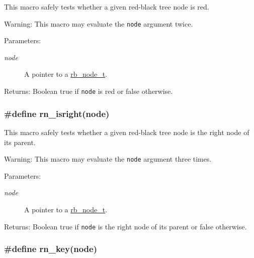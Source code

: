 This macro safely tests whether a given red-black tree node is red.

\begin{Desc}
\item[Warning:]This macro may evaluate the {\tt node} argument twice.\end{Desc}
\begin{Desc}
\item[Parameters:]
\begin{description}
\item[{\em node}]A pointer to a \hyperlink{group__dbprim__rbtree_a1}{rb\_\-node\_\-t}.\end{description}
\end{Desc}
\begin{Desc}
\item[Returns:]Boolean true if {\tt node} is red or false otherwise. \end{Desc}
\hypertarget{group__dbprim__rbtree_a37}{
\subsubsection[rn\_\-isright]{\setlength{\rightskip}{0pt plus 5cm}\#define rn\_\-isright(node)}}
\label{group__dbprim__rbtree_a37}


This macro safely tests whether a given red-black tree node is the right node of its parent.

\begin{Desc}
\item[Warning:]This macro may evaluate the {\tt node} argument three times.\end{Desc}
\begin{Desc}
\item[Parameters:]
\begin{description}
\item[{\em node}]A pointer to a \hyperlink{group__dbprim__rbtree_a1}{rb\_\-node\_\-t}.\end{description}
\end{Desc}
\begin{Desc}
\item[Returns:]Boolean true if {\tt node} is the right node of its parent or false otherwise. \end{Desc}
\hypertarget{group__dbprim__rbtree_a32}{
\subsubsection[rn\_\-key]{\setlength{\rightskip}{0pt plus 5cm}\#define rn\_\-key(node)}}
\label{group__dbprim__rbtree_a32}



